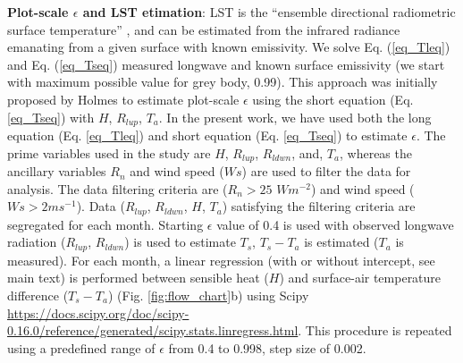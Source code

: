 \documentclass[fleqn,10pt]{wlscirep}
\begin{document}
\textbf{Plot-scale $\epsilon$ and LST etimation}:
LST is the “ensemble directional radiometric surface temperature” \cite{norman1995terminology}, and can be estimated from the infrared radiance emanating from a given surface with known emissivity\cite{kustas2007utility}. We solve Eq. (\ref{eq_Tleq}) and Eq. (\ref{eq_Tseq}) measured longwave and known surface emissivity (we start with maximum possible value for grey body, 0.99). This approach was initially proposed by Holmes\cite{holmes2009land} to estimate plot-scale $\epsilon$ using the short equation (Eq. \ref{eq_Tseq}) with $H$, $R_{lup}$, $T_{a}$. In the present work, we have used both the long equation (Eq. \ref{eq_Tleq}) and short equation (Eq. \ref{eq_Tseq}) to estimate $\epsilon$. The prime variables used in the study are $H$, $R_{lup}$, $R_{ldwn}$, and, $T_{a}$, whereas the ancillary variables $R_{n}$ and wind speed ($Ws$) are used to filter the data for analysis. The data filtering criteria are ($R_{n} > 25$ $Wm^{-2}$) and wind speed ($Ws > 2ms^{-1}$)\cite{holmes2009land}. Data ($R_{lup}$, $R_{ldwn}$, $H$, $T_{a}$) satisfying the filtering criteria are segregated for each  month. Starting $\epsilon$ value of 0.4 is used with observed longwave radiation ($R_{lup}$, $R_{ldwn}$) is used to estimate $T_{s}$, $T_{s}-T_{a}$ is estimated ($T_{a}$ is measured). For each month, a linear regression (with or without intercept, see main text) is performed between sensible heat ($H$) and surface-air temperature difference ($T_{s}-T_{a}$) (Fig. \ref{fig:flow_chart}b) using Scipy \url{https://docs.scipy.org/doc/scipy-0.16.0/reference/generated/scipy.stats.linregress.html}. 
This procedure is repeated using a predefined range of $\epsilon$ from 0.4 to 0.998, step size of 0.002.
\end{document}
